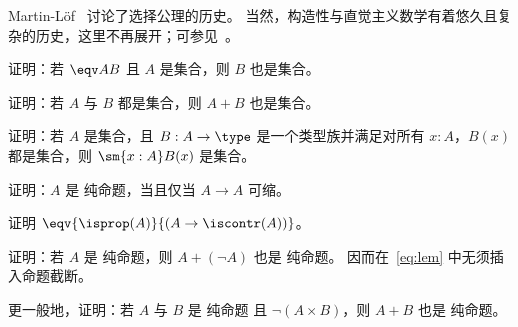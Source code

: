 Martin-L\"of~\cite{martin2006100} 讨论了选择公理的历史。
当然，构造性与直觉主义数学有着悠久且复杂的历史，这里不再展开；可参见~\cite{TroelstraI,TroelstraII}。

\sectionExercises

\begin{ex}\label{ex:equiv-functor-set}
  证明：若 $\eqv A B$ 且 $A$ 是集合，则 $B$ 也是集合。
\end{ex}

\begin{ex}\label{ex:isset-coprod}
  证明：若 $A$ 与 $B$ 都是集合，则 $A+B$ 也是集合。
\end{ex}

\begin{ex}\label{ex:isset-sigma}
  证明：若 $A$ 是集合，且 $B:A\to \type$ 是一个类型族并满足对所有 $x:A$，$B(x)$ 都是集合，则 $\sm{x:A} B(x)$ 是集合。
\end{ex}

\begin{ex}\label{ex:prop-endocontr}
  证明：$A$ 是 纯命题，当且仅当 $A\to A$ 可缩。
\end{ex}

\begin{ex}\label{ex:prop-inhabcontr}
  证明 $\eqv{\isprop(A)}{(A\to\iscontr(A))}$。
\end{ex}

\begin{ex}\label{ex:lem-mereprop}
  证明：若 $A$ 是 纯命题，则 $A+(\neg A)$ 也是 纯命题。
  因而在~\eqref{eq:lem} 中无须插入命题截断。
\end{ex}

\begin{ex}\label{ex:disjoint-or}
  更一般地，证明：若 $A$ 与 $B$ 是 纯命题 且 $\neg(A\times B)$，则 $A+B$ 也是 纯命题。
\end{ex}




